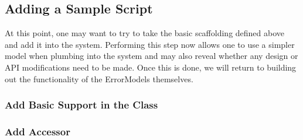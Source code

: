 \documentclass[letterpaper,10pt,english]{sphinxmanual}
\begin{document}
\subsection{Adding a Sample Script}
\label{\detokenize{new-models:adding-a-sample-script}}
At this point, one may want to try to take the basic scaffolding defined above
and add it into the system. Performing this step now allows one to use a simpler
model when plumbing into the system and may also reveal whether any design or
API modifications need to be made. Once this is done, we will return to building
out the functionality of the ErrorModels themselves.


\subsubsection{Add Basic Support in the Class}
\label{\detokenize{new-models:add-basic-support-in-the-class}}
\begin{sphinxVerbatim}[commandchars=\\\{\}]
   

   
\end{sphinxVerbatim}


\subsubsection{Add Accessor}
\label{\detokenize{new-models:add-accessor}}
\begin{sphinxVerbatim}[commandchars=\\\{\}]
  
     
    

    
                    
                    
                    
\end{sphinxVerbatim}
\end{document}
